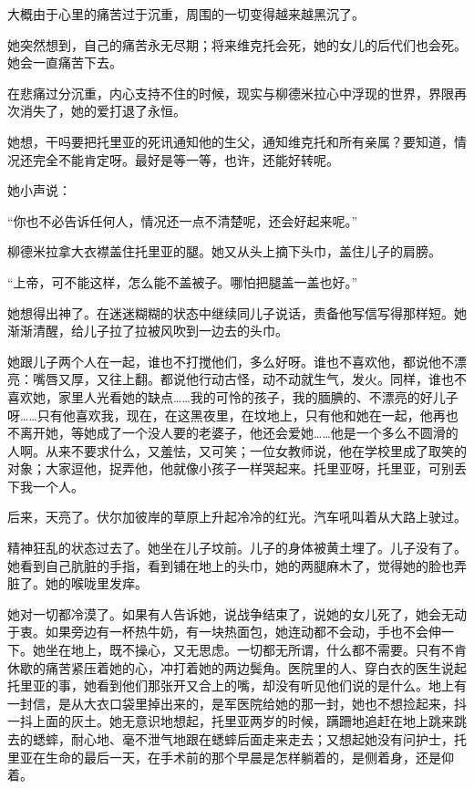 大概由于心里的痛苦过于沉重，周围的一切变得越来越黑沉了。

她突然想到，自己的痛苦永无尽期；将来维克托会死，她的女儿的后代们也会死。她会一直痛苦下去。

在悲痛过分沉重，内心支持不住的时候，现实与柳德米拉心中浮现的世界，界限再次消失了，她的爱打退了永恒。

她想，干吗要把托里亚的死讯通知他的生父，通知维克托和所有亲属？要知道，情况还完全不能肯定呀。最好是等一等，也许，还能好转呢。

她小声说：

“你也不必告诉任何人，情况还一点不清楚呢，还会好起来呢。”

柳德米拉拿大衣襟盖住托里亚的腿。她又从头上摘下头巾，盖住儿子的肩膀。

“上帝，可不能这样，怎么能不盖被子。哪怕把腿盖一盖也好。”

她想得出神了。在迷迷糊糊的状态中继续同儿子说话，责备他写信写得那样短。她渐渐清醒，给儿子拉了拉被风吹到一边去的头巾。

她跟儿子两个人在一起，谁也不打搅他们，多么好呀。谁也不喜欢他，都说他不漂亮：嘴唇又厚，又往上翻。都说他行动古怪，动不动就生气，发火。同样，谁也不喜欢她，家里人光看她的缺点……我的可怜的孩子，我的腼腆的、不漂亮的好儿子呀……只有他喜欢我，现在，在这黑夜里，在坟地上，只有他和她在一起，他再也不离开她，等她成了一个没人要的老婆子，他还会爱她……他是一个多么不圆滑的人啊。从来不要求什么，又羞怯，又可笑；一位女教师说，他在学校里成了取笑的对象；大家逗他，捉弄他，他就像小孩子一样哭起来。托里亚呀，托里亚，可别丢下我一个人。

后来，天亮了。伏尔加彼岸的草原上升起冷冷的红光。汽车吼叫着从大路上驶过。

精神狂乱的状态过去了。她坐在儿子坟前。儿子的身体被黄土埋了。儿子没有了。她看到自己肮脏的手指，看到铺在地上的头巾，她的两腿麻木了，觉得她的脸也弄脏了。她的喉咙里发痒。

她对一切都冷漠了。如果有人告诉她，说战争结束了，说她的女儿死了，她会无动于衷。如果旁边有一杯热牛奶，有一块热面包，她连动都不会动，手也不会伸一下。她坐在地上，既不操心，又无思虑。一切都无所谓，什么都不需要。只有不肯休歇的痛苦紧压着她的心，冲打着她的两边鬓角。医院里的人、穿白衣的医生说起托里亚的事，她看到他们那张开又合上的嘴，却没有听见他们说的是什么。地上有一封信，是从大衣口袋里掉出来的，是军医院给她的那一封，她也不想捡起来，抖一抖上面的灰土。她无意识地想起，托里亚两岁的时候，蹒跚地追赶在地上跳来跳去的蟋蟀，耐心地、毫不泄气地跟在蟋蟀后面走来走去；又想起她没有问护士，托里亚在生命的最后一天，在手术前的那个早晨是怎样躺着的，是侧着身，还是仰着。

